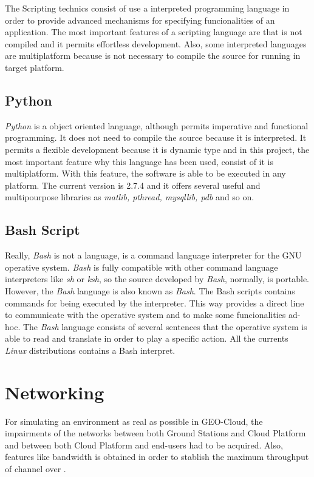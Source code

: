 The Scripting technics consist of use a interpreted programming language in
order to provide advanced mechanisms for specifying funcionalities of an
application. The most important features of a scripting language are that is not
compiled and it permits effortless development. Also, some interpreted languages
are multiplatform because is not necessary to compile the source for running in
target platform. 


\subsection{Python}
\emph{Python} is a object oriented language, although permits imperative and functional
programming. It does not need to compile the source because it is
interpreted. It permits a flexible development because it is dynamic type and in
this project, the most important feature why this language has been used,
consist of it is multiplatform. With this feature, the software is able to be
executed in any platform. The current version is 2.7.4 and it offers several
useful and multipourpose libraries as \emph{matlib, pthread, mysqllib, pdb} and so on.

\subsection{Bash Script}

Really, \emph{Bash} is not a language, is a command language interpreter for the GNU
operative system. \emph{Bash} is fully compatible with other command language
interpreters like \emph{sh} or \emph{ksh}, so the source developed by \emph{Bash}, normally, is
portable. 
However, the \emph{Bash} language is also known as \emph{Bash}. The Bash scripts contains
commands for being executed by the interpreter. This way provides a direct line
to communicate with the operative system and to make some funcionalities ad-hoc.
The \emph{Bash} language consists of several sentences that the operative system is
able to read and translate in order to play a specific action. All the currents
\emph{Linux} distributions contains a Bash interpret. 


\section{Networking}

For simulating an environment as real as possible in GEO-Cloud, the impairments  of the networks between both Ground Stations and Cloud Platform
and between both Cloud Platform and end-users had to be acquired. Also, features
like bandwidth is obtained in order to stablish the maximum throughput of
channel over \vw.

